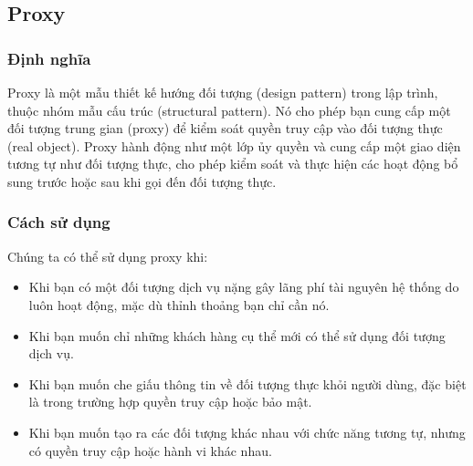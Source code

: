 \subsection{Proxy}
\subsubsection{Định nghĩa}
Proxy là một mẫu thiết kế hướng đối tượng (design pattern) trong lập trình, thuộc nhóm mẫu cấu trúc (structural pattern). Nó cho phép bạn cung cấp một đối tượng trung gian (proxy) để kiểm soát quyền truy cập vào đối tượng thực (real object). Proxy hành động như một lớp ủy quyền và cung cấp một giao diện tương tự như đối tượng thực, cho phép kiểm soát và thực hiện các hoạt động bổ sung trước hoặc sau khi gọi đến đối tượng thực.
\subsubsection{Cách sử dụng}
Chúng ta có thể sử dụng proxy khi:
\begin{itemize}
    \item Khi bạn có một đối tượng dịch vụ nặng gây lãng phí tài nguyên hệ thống do luôn hoạt động, mặc dù thỉnh thoảng bạn chỉ cần nó.
    \item Khi bạn muốn chỉ những khách hàng cụ thể mới có thể sử dụng đối tượng dịch vụ.
    \item Khi bạn muốn che giấu thông tin về đối tượng thực khỏi người dùng, đặc biệt là trong trường hợp quyền truy cập hoặc bảo mật.
    \item Khi bạn muốn tạo ra các đối tượng khác nhau với chức năng tương tự, nhưng có quyền truy cập hoặc hành vi khác nhau.
\end{itemize}
